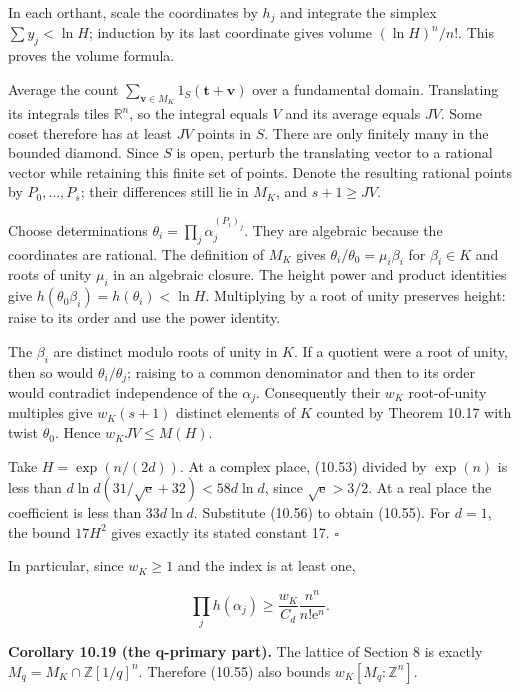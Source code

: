 \documentclass[
  11pt,
  a4paper,
]{article}
\begin{document}
In each orthant, scale the coordinates by \(h_j\) and integrate the
simplex \(\sum y_j<\ln H\); induction by its last coordinate gives
volume \((\ln H)^n/n!\). This proves the volume formula.

Average the count
\(\sum_{\boldsymbol v\in M_K}1_S(\boldsymbol t+\boldsymbol v)\) over a
fundamental domain. Translating its integrals tiles \(\mathbb R^n\), so
the integral equals \(V\) and its average equals \(JV\). Some coset
therefore has at least \(JV\) points in \(S\). There are only finitely
many in the bounded diamond. Since \(S\) is open, perturb the
translating vector to a rational vector while retaining this finite set
of points. Denote the resulting rational points by \(P_0,\ldots,P_s\);
their differences still lie in \(M_K\), and \(s+1\ge JV\).

Choose determinations \(\theta_i=\prod_j\alpha_j^{(P_i)_j}\). They are
algebraic because the coordinates are rational. The definition of
\(M_K\) gives \(\theta_i/\theta_0=\mu_i\beta_i\) for \(\beta_i\in K\)
and roots of unity \(\mu_i\) in an algebraic closure. The height power
and product identities give \(h(\theta_0\beta_i)=h(\theta_i)<\ln H\).
Multiplying by a root of unity preserves height: raise to its order and
use the power identity.

The \(\beta_i\) are distinct modulo roots of unity in \(K\). If a
quotient were a root of unity, then so would \(\theta_i/\theta_j\);
raising to a common denominator and then to its order would contradict
independence of the \(\alpha_j\). Consequently their \(w_K\)
root-of-unity multiples give \(w_K(s+1)\) distinct elements of \(K\)
counted by Theorem 10.17 with twist \(\theta_0\). Hence
\(w_KJV\le M(H)\).

Take \(H=\exp(n/(2d))\). At a complex place, (10.53) divided by
\(\exp(n)\) is less than \(d\ln d(31/\sqrt{\mathrm e}+32)<58d\ln d\),
since \(\sqrt{\mathrm e}>3/2\). At a real place the coefficient is less
than \(33d\ln d\). Substitute (10.56) to obtain (10.55). For \(d=1\),
the bound \(17H^2\) gives exactly its stated constant 17. \(\square\)

In particular, since \(w_K\ge1\) and the index is at least one,

\[
\prod_jh(\alpha_j)\ge
\frac{w_K}{C_d}\frac{n^n}{n!\mathrm e^n}.
\tag{10.57}
\]

\textbf{Corollary 10.19 (the q-primary part).} The lattice of Section 8
is exactly \(M_q=M_K\cap\mathbb Z[1/q]^n\). Therefore (10.55) also
bounds \(w_K[M_q:\mathbb Z^n]\).
\end{document}
